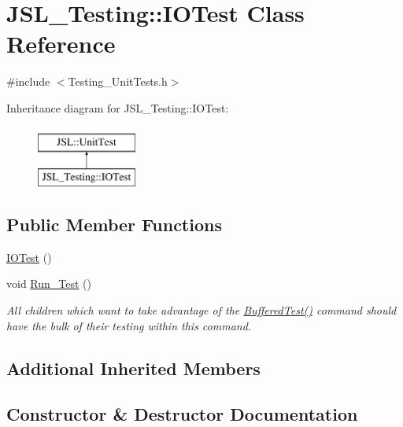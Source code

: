 \hypertarget{classJSL__Testing_1_1IOTest}{}\section{J\+S\+L\+\_\+\+Testing\+:\+:I\+O\+Test Class Reference}
\label{classJSL__Testing_1_1IOTest}


{\ttfamily \#include $<$Testing\+\_\+\+Unit\+Tests.\+h$>$}

Inheritance diagram for J\+S\+L\+\_\+\+Testing\+:\+:I\+O\+Test\+:\begin{figure}[H]
\begin{center}
\leavevmode
\includegraphics[height=2.000000cm]{classJSL__Testing_1_1IOTest}
\end{center}
\end{figure}
\subsection*{Public Member Functions}
\begin{DoxyCompactItemize}
\item 
\hyperlink{classJSL__Testing_1_1IOTest_a75479573809562118ab4d233c2bc0471}{I\+O\+Test} ()
\item 
void \hyperlink{classJSL__Testing_1_1IOTest_a85daecacc71354b5dc0dee36840b8704}{Run\+\_\+\+Test} ()
\begin{DoxyCompactList}\small\item\em All children which want to take advantage of the \hyperlink{classJSL_1_1UnitTest_aabec19b081be8a428f12e4b5e3dc2a9c}{Buffered\+Test()} command should have the bulk of their testing within this command. \end{DoxyCompactList}\end{DoxyCompactItemize}
\subsection*{Additional Inherited Members}


\subsection{Constructor \& Destructor Documentation}
\mbox{\label{classJSL__Testing_1_1IOTest_a75479573809562118ab4d233c2bc0471}} 
